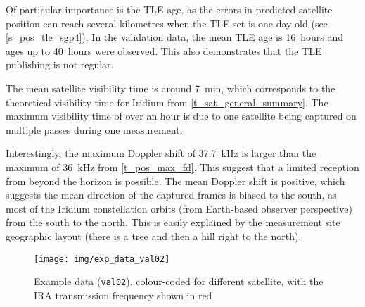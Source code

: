 Of particular importance is the TLE age, as the errors in predicted satellite position can reach several kilometres when the TLE set is one day old (see \autoref{s_pos_tle_sgp4}). In the validation data, the mean TLE age is \qty{16}{hours} and ages up to \qty{40}{hours} were observed. This also demonstrates that the TLE publishing is not regular.

The mean satellite visibility time is around \qty{7}{min}, which corresponds to the theoretical visibility time for Iridium from \autoref{t_sat_general_summary}. The maximum visibility time of over an hour is due to one satellite being captured on multiple passes during one measurement.

Interestingly, the maximum Doppler shift of \qty{37.7}{kHz} is larger than the maximum of \qty{36}{kHz} from \autoref{t_pos_max_fd}. This suggest that a limited reception from beyond the horizon is possible. The mean Doppler shift is positive, which suggests the mean direction of the captured frames is biased to the south, as most of the Iridium constellation orbits (from Earth-based observer perspective) from the south to the north. This is easily explained by the measurement site geographic layout (there is a tree and then a hill right to the north).

\begin{figure}
    \centering
    \texttt{[image: img/exp\_data\_val02]}
    \caption[Example data]{Example data (\texttt{val02}), colour-coded for different satellite, with the IRA transmission frequency shown in red}
    \label{f_exp_data_val02}
\end{figure}

